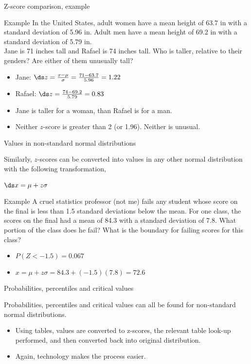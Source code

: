 \documentclass[xcolor=table, handout]{beamer}
\begin{document}
\begin{frame}{Z-score comparison, example}
\begin{exampleblock}{Example}
In the United States, adult women have a mean height of 63.7 in with a standard deviation of 5.96 in. Adult men have a mean height of 69.2 in with a standard deviation of 5.79 in.\\
\medskip
Jane is 71 inches tall and Rafael is 74 inches tall. Who is taller, relative to their genders? Are either of them unusually tall?
\begin{itemize}
\pause\item Jane: $\ds z = \frac {x - \mu}{\sigma} = \frac {71 - 63.7}{5.96} = 1.22$
\pause\item Rafael: $\ds z = \frac {74 - 69.2}{5.79} = 0.83$
\pause\item Jane is taller for a woman, than Rafael is for a man.
\pause\item Neither $z$-score is greater than 2 (or 1.96). Neither is unusual.
\end{itemize}
\end{exampleblock}
\end{frame}

\begin{frame}{Values in non-standard normal distributions}
\begin{block}{}
Similarly, $z$-scores can be converted into values in any other normal distribution with the following transformation,\\
\smallskip
{\centering
$\ds x = \mu + z \sigma$
\par}
\medskip
\end{block}

\pause
\begin{exampleblock}{Example}
A cruel statistics professor (not me) fails any student whose score on the final is less than 1.5 standard deviations below the mean. For one class, the scores on the final had a mean of 84.3 with a standard deviation of 7.8. What portion of the class does he fail? What is the boundary for failing scores for this class?
\begin{itemize}
\pause\item $P(Z < -1.5) = 0.067$
\pause\item $x = \mu + z \sigma = 84.3 + (-1.5) (7.8) = 72.6$
\end{itemize} 
\end{exampleblock}
\end{frame}

\begin{frame}{Probabilities, percentiles and critical values}
\begin{block}{}
Probabilities, percentiles and critical values can all be found for non-standard normal distributions.
\begin{itemize}
\item Using tables, values are converted to z-scores, the relevant table look-up performed, and then converted back into original distribution.
\item Again, technology makes the process easier.
\end{itemize}
\end{block}
\end{frame}
\end{document}
